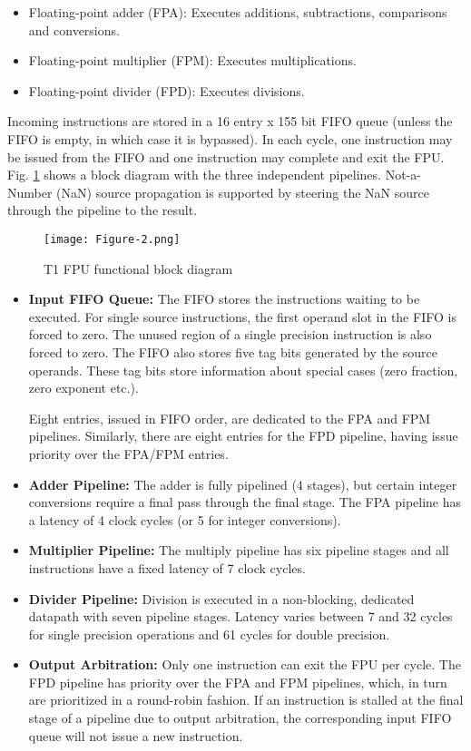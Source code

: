\documentclass[12pt]{yalephd}
\begin{document}
\begin{itemize}
\item Floating-point adder (FPA): Executes additions, subtractions, comparisons and conversions.
\item Floating-point multiplier (FPM): Executes multiplications.
\item Floating-point divider (FPD): Executes divisions.
\end{itemize}

Incoming instructions are stored in a 16 entry x 155 bit FIFO queue (unless the FIFO is empty, in which case it is bypassed). In each cycle, one instruction may be issued from the FIFO and one instruction may complete and exit the FPU. Fig. \ref{sC3fT1FPU} shows a block diagram with the three independent pipelines. Not-a-Number (NaN) source propagation is supported by steering the NaN source through the pipeline to the result.

\begin{figure}[!ht]
\centering
\texttt{[image: Figure-2.png]}
\caption{T1 FPU functional block diagram \cite{Su06}}\label{sC3fT1FPU}
\end{figure}

\begin{itemize}
\item {\bf Input FIFO Queue:} The FIFO stores the instructions waiting to be executed. For single source instructions, the first operand slot in the FIFO is forced to zero. The unused region of a single precision instruction is also forced to zero. The FIFO also stores five tag bits generated by the source operands. These tag bits store information about special cases (zero fraction, zero exponent etc.).

Eight entries, issued in FIFO order, are dedicated to the FPA and FPM pipelines. Similarly, there are eight entries for the FPD pipeline, having issue priority over the FPA/FPM entries.

\item {\bf Adder Pipeline:} The adder is fully pipelined (4 stages), but certain integer conversions require a final pass through the final stage. The FPA pipeline has a latency of 4 clock cycles (or 5 for integer conversions).

\item {\bf Multiplier Pipeline:} The multiply pipeline has six pipeline stages and all instructions have a fixed latency of 7 clock cycles.

\item {\bf Divider Pipeline:} Division is executed in a non-blocking, dedicated datapath with seven pipeline stages. Latency varies between 7 and 32 cycles for single precision operations and 61 cycles for double precision.

\item {\bf Output Arbitration:} Only one instruction can exit the FPU per cycle. The FPD pipeline has priority over the FPA and FPM pipelines, which, in turn are prioritized in a round-robin fashion. If an instruction is stalled at the final stage of a pipeline due to output arbitration, the corresponding input FIFO queue will not issue a new instruction.
\end{itemize}
\end{document}
